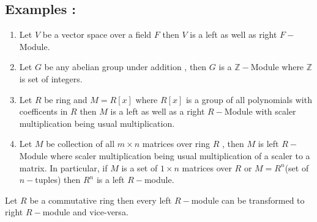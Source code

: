 \subsection{Examples :}
\begin{enumerate}
\item Let $V$ be a vector space over a field $F$ then $V$ is a left as well as right $F-$Module.\newline \bigskip
\item Let $G$ be any abelian group under addition , then $G$ is a $\mathbb{Z-}$Module where $\mathbb{Z}$ is set of integers.\newline \bigskip
\item Let $R$ be ring and $M= R[x]$  where $R[x]$ is a group of all polynomials with coefficents in $R$ then $M$ is a left as well as a right $R-$Module with scaler multiplication being usual multiplication.\newline \bigskip
\item Let $M$ be collection of all $m \times n $ matrices over ring $R$ , then $M$ is left $R-$Module where scaler multiplication being usual multiplication of a scaler to a matrix. \newline
\bigskip
In particular, if $M$ is a set of $1 \times n$ matrices over $R$ or $M = R^n$(set of $n-$tuples) then $R^n$ is a left $R-$module.
\end{enumerate}
\bigskip
\begin{remark}
	Let $R$ be a commutative ring then every left $R-$module can be transformed to right $R-$module and vice-versa.
	\end{remark}

